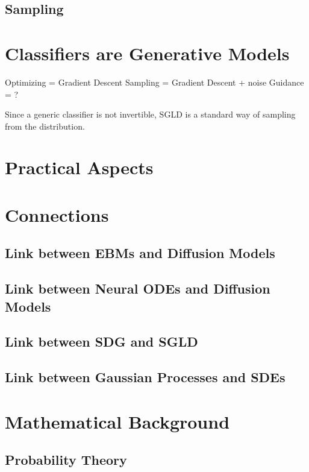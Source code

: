 \documentclass[a4paper, 11pt]{article}
\begin{document}
\subsection{Sampling}


\section{Classifiers are Generative Models}

Optimizing = Gradient Descent
Sampling = Gradient Descent + noise
Guidance = ?

Since a generic classifier is not invertible, SGLD is a standard way of sampling from the distribution.

\section{Practical Aspects}

\section{Connections}
\subsection{Link between EBMs and Diffusion Models}
\subsection{Link between Neural ODEs and Diffusion Models}
\subsection{Link between SDG and SGLD}
\subsection{Link between Gaussian Processes and SDEs}

\appendix
\section{Mathematical Background}
\subsection{Probability Theory}


 

\end{document}
